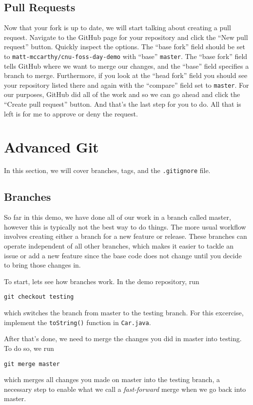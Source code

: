 \documentclass[notitlepage]{simple}
\begin{document}
\subsection{Pull Requests}

Now that your fork is up to date, we will start talking about creating a pull request.
Navigate to the GitHub page for your repository and click the ``New pull request'' button.
Quickly inspect the options.
The ``base fork'' field should be set to \verb|matt-mccarthy/cnu-foss-day-demo| with ``base'' \verb|master|.
The ``base fork'' field tells GitHub where we want to merge our changes, and the ``base'' field specifies a branch to merge.
Furthermore, if you look at the ``head fork'' field you should see your repository listed there and again with the ``compare'' field set to \verb|master|.
For our purposes, GitHub did all of the work and so we can go ahead and click the ``Create pull request'' button.
And that's the last step for you to do.
All that is left is for me to approve or deny the request.

\section{Advanced Git}

In this section, we will cover branches, tags, and the \verb|.gitignore| file.

\subsection{Branches}

So far in this demo, we have done all of our work in a branch called master, however this is typically not the best way to do things.
The more usual workflow involves creating either a branch for a new feature or release.
These branches can operate independent of all other branches, which makes it easier to tackle an issue or add a new feature since the base code does not change until you decide to bring those changes in.

To start, lets see how branches work.
In the demo repository, run
\begin{terminal}
	\verb|git checkout testing|
\end{terminal}
which switches the branch from master to the testing branch.
For this excercise, implement the \verb|toString()| function in \verb|Car.java|.

After that's done, we need to merge the changes you did in master into testing.
To do so, we run
\begin{terminal}
	\verb|git merge master|
\end{terminal}
which merges all changes you made on master into the testing branch, a necessary step to enable what we call a \textit{fast-forward} merge when we go back into master.
\end{document}
